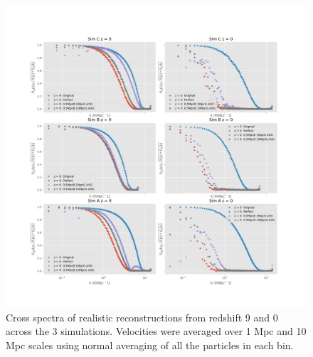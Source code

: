 \begin{figure}
    \centering
    \includegraphics[width=1\columnwidth]{images/crossSpectra/Spec_9_sims.png}%
    
    \caption{
        Cross spectra of realistic reconstructions from redshift 9 and 0 across the 3 simulations. Velocities were averaged over 1 Mpc and 10 Mpc scales using normal averaging of all the particles in each bin.
    }
    
    \label{fig:11}
\end{figure}

